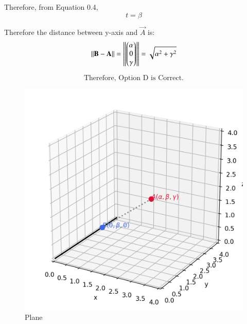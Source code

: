 \documentclass[journal]{IEEEtran}
\begin{document}
Therefore, from Equation 0.4,
\begin{equation}
t=\beta
\end{equation}

Therefore the distance between y-axis and $\vec{A}$ is:
\begin{equation}
    \left\lVert\mathbf{B-A}\right\rVert  = \left\lVert\begin{pmatrix}\alpha \\ 0 \\ \gamma\end{pmatrix}\right\rVert = \sqrt{\alpha^2 + \gamma^2}
\end{equation}

\begin{equation}
\boxed{\text{Therefore, Option D is Correct.}}    
\end{equation}

\begin{figure}[htbp]
    \centering
    \includegraphics[width=\columnwidth]{figs/fig1.png}
    \caption{Plane}
    \label{fig:fig/fig1.png}
\end{figure}
\end{document}
